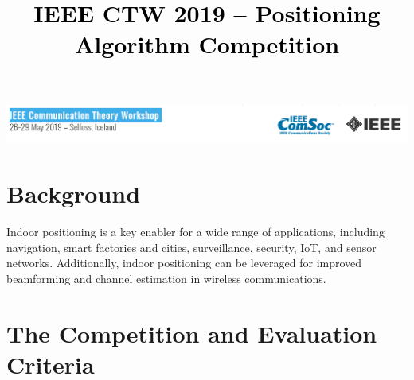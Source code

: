 \documentclass[letter]{moderncv} %
\title{\textbf{\textcolor{black}{IEEE CTW 2019 -- Positioning Algorithm Competition}}} %
\begin{document}
\thispagestyle{empty}
\includegraphics[width=1\textwidth]{Comsoc}
\maketitle %
\vspace{-4ex}
\section{Background}
Indoor positioning  is  a key enabler for a wide range of  applications, including   navigation, smart factories and cities, surveillance, security, IoT, and sensor networks. 
Additionally, indoor positioning  can be leveraged for improved beamforming and  channel estimation in wireless communications. 






\section{The Competition and Evaluation Criteria}
\end{document}
